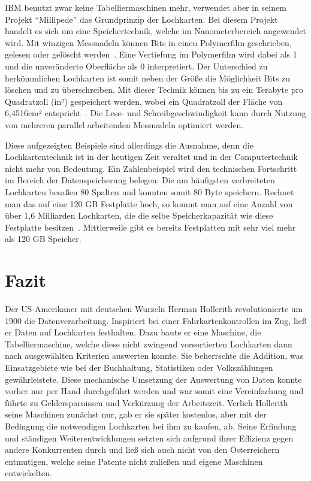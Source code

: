 \documentclass[parskip=half]{scrartcl}
\begin{document}
IBM benutzt zwar keine Tabelliermaschinen mehr, verwendet aber in seinem
Projekt \enquote{Millipede} das Grundprinzip der Lochkarten. Bei diesem Projekt
handelt es sich um eine Speichertechnik, welche im Nanometerbereich angewendet
wird.  Mit winzigen Messnadeln können Bits in einen Polymerfilm geschrieben,
gelesen oder gelöscht werden~\cite{binnig}. Eine Vertiefung im
Polymerfilm wird dabei als 1 und die unveränderte Oberfläche als 0
interpretiert. Der Unterschied zu herkömmlichen Lochkarten ist somit neben der
Größe die Möglichkeit Bits zu löschen und zu überschreiben. Mit dieser Technik
können bis zu ein Terabyte pro Quadratzoll (in²) gespeichert werden, wobei ein
Quadratzoll der Fläche von 6,4516cm² entspricht~\cite{binnig}. Die
Lese- und Schreibgeschwindigkeit kann durch Nutzung von mehreren parallel
arbeitenden Messnadeln optimiert werden.

Diese aufgezeigten Beispiele sind allerdings die Ausnahme, denn die
Lochkartentechnik ist in der heutigen Zeit veraltet und in der Computertechnik
nicht mehr von Bedeutung. Ein Zahlenbeispiel wird den technischen Fortschritt
im Bereich der Datenspeicherung belegen: Die am häufigsten verbreiteten
Lochkarten besaßen 80 Spalten und konnten somit 80 Byte speichern. Rechnet man
das auf eine 120 GB Festplatte hoch, so kommt man auf eine Anzahl von über 1,6
Milliarden Lochkarten, die die selbe Speicherkapazität wie diese Festplatte
besitzen~\cite{roeltgen}. Mittlerweile gibt es bereits Festplatten mit sehr
viel mehr als 120 GB Speicher.

\section{Fazit}

Der US-Amerikaner mit deutschen Wurzeln Herman Hollerith revolutionierte um
1900 die Datenverarbeitung.  Inspiriert bei einer Fahrkartenkontrollen im Zug,
ließ er Daten auf Lochkarten festhalten. Dazu baute er eine Maschine, die
Tabelliermaschine, welche diese nicht zwingend vorsortierten Lochkarten dann
nach ausgewählten Kriterien auswerten konnte.  Sie beherrschte die Addition,
was Einsatzgebiete wie bei der Buchhaltung, Statistiken oder Volkszählungen
gewährleistete. Diese mechanische Umsetzung der Auswertung von Daten konnte
vorher nur per Hand durchgeführt werden und war somit eine Vereinfachung und
führte zu Geldersparnissen und Verkürzung der Arbeitszeit.  Verlieh Hollerith
seine Maschinen zunächst nur, gab er sie später kostenlos, aber mit der
Bedingung die notwendigen Lochkarten bei ihm zu kaufen, ab.  Seine Erfindung
und ständigen Weiterentwicklungen setzten sich aufgrund ihrer Effizienz gegen
andere Konkurrenten durch und ließ sich auch nicht von den Österreichern
entmutigen, welche seine Patente nicht zuließen und eigene Maschinen
entwickelten.
\end{document}
